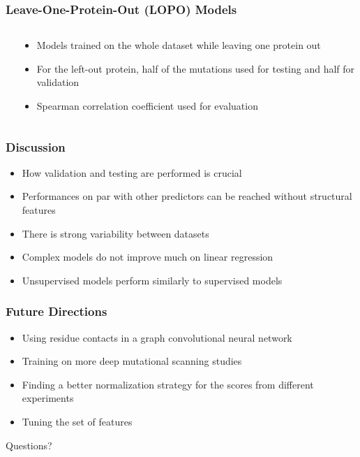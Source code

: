 \documentclass[10pt, british, luatex]{beamer}
\begin{document}
\begin{frame}
	\frametitle{Leave-One-Protein-Out (LOPO) Models}
	\begin{columns}[c]
		\begin{column}{.6\textwidth}
			\vfill\null%
			{%
				\centering%
				\let\bfseries\sbseries%
				
			}
		\end{column}
		\begin{column}{.4\textwidth}
			\vspace{-3em}
			\begin{itemize}
				\item Models trained on the whole dataset while leaving one protein out
				\item For the left-out protein, half of the mutations used for testing and half for validation
				\item Spearman correlation coefficient used for evaluation
			\end{itemize}
		\end{column}
	\end{columns}
\end{frame}

\begin{frame}
	\frametitle{Discussion}
	\begin{itemize}
		\item How validation and testing are performed is crucial
		\item Performances on par with other predictors can be reached without structural features
		\item There is strong variability between datasets
		\item Complex models do not improve much on linear regression
		\item Unsupervised models perform similarly to supervised models
	\end{itemize}
\end{frame}

\begin{frame}
	\frametitle{Future Directions}
	\begin{itemize}
		\item Using residue contacts in a graph convolutional neural network
		\item Training on more deep mutational scanning studies
		\item Finding a better normalization strategy for the scores from different experiments
		\item Tuning the set of features
	\end{itemize}
	\pause%
	\vfill%
	\Huge\centering Questions?
\end{frame}
\end{document}
